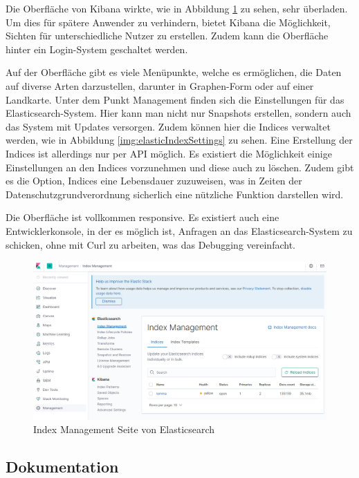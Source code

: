 Die Oberfläche von Kibana wirkte, wie in Abbildung \ref{img:elasticInterface} zu sehen, sehr überladen. Um dies für spätere Anwender zu verhindern, bietet Kibana die Möglichkeit, Sichten für unterschiedliche Nutzer zu erstellen. Zudem kann die Oberfläche hinter ein Login-System geschaltet werden.

Auf der Oberfläche gibt es viele Menüpunkte, welche es ermöglichen, die Daten auf diverse Arten darzustellen, darunter in Graphen-Form oder auf einer Landkarte. Unter dem Punkt Management finden sich die Einstellungen für das Elasticsearch-System. Hier kann man nicht nur Snapshots erstellen, sondern auch das System mit Updates versorgen. Zudem können hier die Indices verwaltet werden, wie in Abbildung \ref{img:elasticIndexSettings} zu sehen. Eine Erstellung der Indices ist allerdings nur per API möglich. Es existiert die Möglichkeit einige Einstellungen an den Indices vorzunehmen und diese auch zu löschen. Zudem gibt es die Option, Indices eine Lebensdauer zuzuweisen, was in Zeiten der Datenschutzgrundverordnung sicherlich eine nützliche Funktion darstellen wird. 

Die Oberfläche ist vollkommen responsive. Es existiert auch eine Entwicklerkonsole, in der es möglich ist, Anfragen an das Elasticsearch-System zu schicken, ohne mit Curl zu arbeiten, was das Debugging vereinfacht.

\begin{figure}
	\centering
	\includegraphics[width=1\linewidth]{images/elastic_ui.png}
	\caption{Index Management Seite von Elasticsearch}
	\label{img:elasticInterface}
\end{figure}


\subsection{Dokumentation}


